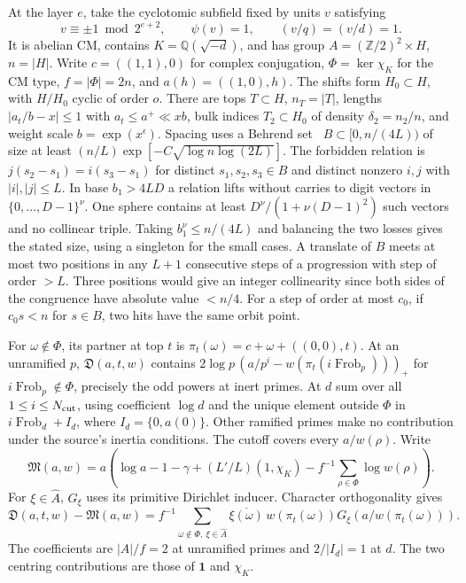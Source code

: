 \documentclass[letterpaper,11pt]{article}
\newcommand{\QQ}{\mathbb Q}
\newcommand{\ZZ}{\mathbb Z}
\newcommand{\Frob}{\operatorname{Frob}}
\newcommand{\Dsum}{\mathfrak D}
\newcommand{\Msum}{\mathfrak M}
\begin{document}
At the layer \(e\), take the cyclotomic subfield fixed by units \(v\) satisfying
\[
 v\equiv\pm1\bmod 2^{e+2},\qquad\psi(v)=1,\qquad (v/q)=(v/d)=1.
\]
It is abelian CM, contains \(K=\QQ(\sqrt{-d})\), and has group \(A=(\ZZ/2)^2\times H\), \(n=|H|\). Write \(c=((1,1),0)\) for complex conjugation, \(\Phi=\ker\chi_K\) for the CM type, \(f=|\Phi|=2n\), and \(a(h)=((1,0),h)\). The shifts form \(H_0\subset H\), with \(H/H_0\) cyclic of order \(o\). There are tops \(T\subset H\), \(n_T=|T|\), lengths \(|a_t/b-x|\le1\) with \(a_t\le a^+\ll xb\), bulk indices \(T_2\subset H_0\) of density \(\delta_2=n_2/n\), and weight scale \(b=\exp(x^\epsilon)\). Spacing uses a Behrend set~\cite{behrend} \(B\subset[0,n/(4L))\) of size at least \((n/L)\exp[-C\sqrt{\log n\log(2L)}]\). The forbidden relation is \(j(s_2-s_1)=i(s_3-s_1)\) for distinct \(s_1,s_2,s_3\in B\) and distinct nonzero \(i,j\) with \(|i|,|j|\le L\). In base \(b_1>4LD\) a relation lifts without carries to digit vectors in \(\{0,\ldots,D-1\}^\nu\). One sphere contains at least \(D^\nu/(1+\nu(D-1)^2)\) such vectors and no collinear triple. Taking \(b_1^\nu\le n/(4L)\) and balancing the two losses gives the stated size, using a singleton for the small cases. A translate of \(B\) meets at most two positions in any \(L+1\) consecutive steps of a progression with step of order \(>L\). Three positions would give an integer collinearity since both sides of the congruence have absolute value \(<n/4\). For a step of order at most \(c_0\), if \(c_0s<n\) for \(s\in B\), two hits have the same orbit point.

For \(\omega\notin\Phi\), its partner at top \(t\) is \(\pi_t(\omega)=c+\omega+((0,0),t)\). At an unramified \(p\), \(\Dsum(a,t,w)\) contains \(2\log p\,(a/p^i-w(\pi_t(i\Frob_p)))_+\) for \(i\Frob_p\notin\Phi\), precisely the odd powers at inert primes. At \(d\) sum over all \(1\le i\le N_{\rm cut}\), using coefficient \(\log d\) and the unique element outside \(\Phi\) in \(i\Frob_d+I_d\), where \(I_d=\{0,a(0)\}\). Other ramified primes make no contribution under the source's inertia conditions. The cutoff covers every \(a/w(\rho)\). Write
\[
 \Msum(a,w)=a\left(\log a-1-\gamma+(L'/L)(1,\chi_K)-f^{-1}\sum_{\rho\in\Phi}\log w(\rho)\right).
\]
For \(\xi\in\widehat A\), \(G_\xi\) uses its primitive Dirichlet inducer. Character orthogonality gives
\[
 \Dsum(a,t,w)-\Msum(a,w)=
 f^{-1}\!\!\sum_{\omega\notin\Phi,\ \xi\in\widehat A}
 \overline{\xi(\omega)}\, w(\pi_t(\omega))G_\xi\!\left(a/w(\pi_t(\omega))\right).
\]
The coefficients are \(|A|/f=2\) at unramified primes and \(2/|I_d|=1\) at \(d\). The two centring contributions are those of \(\mathbf1\) and \(\chi_K\).
\end{document}
